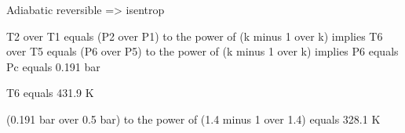 Adiabatic reversible => isentrop

T2 over T1 equals (P2 over P1) to the power of (k minus 1 over k) implies T6 over T5 equals (P6 over P5) to the power of (k minus 1 over k) implies P6 equals Pc equals 0.191 bar

T6 equals 431.9 K

(0.191 bar over 0.5 bar) to the power of (1.4 minus 1 over 1.4) equals 328.1 K
